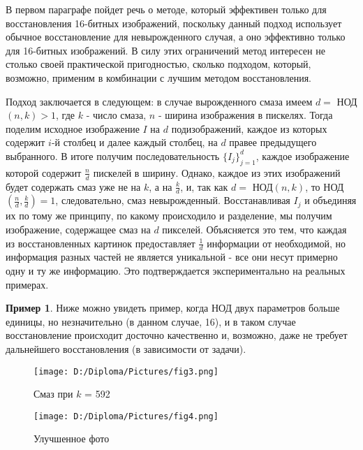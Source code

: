 \documentclass[a4paper]{article}
\theoremstyle{definition}
\newtheorem*{example}{Пример}
\begin{document}
    В первом параграфе пойдет речь о методе, который эффективен только для восстановления 16-битных изображений, поскольку данный подход использует обычное восстановление для невырожденного случая, а оно эффективно только для 16-битных изображений. В силу этих ограничений метод интересен не столько своей практической пригодностью, сколько подходом, который, возможно, применим в комбинации с лучшим методом восстановления.


    Подход заключается в следующем: в случае вырожденного смаза имеем $d =$ НОД$(n, k) > 1$, где $k$ - число смаза, $n$ - ширина изображения в пискелях. Тогда поделим исходное изображение $I$ на $d$ подизображений, каждое из которых содержит $i$-й столбец и далее каждый столбец, на $d$ правее предыдущего выбранного. В итоге получим последовательность $\{I_j\}_{j=1}^{d}$, каждое изображение которой содержит $\frac{n}{d}$ пискелей в ширину. Однако, каждое из этих изображений будет содержать смаз уже не на $k$, а на $\frac{k}{d}$, и, так как $d =$ НОД$(n, k)$, то НОД$(\frac{n}{d}, \frac{k}{d}) = 1$, следовательно, смаз невырожденный. Восстанавливая $I_j$ и объединяя их по тому же принципу, по какому происходило и разделение, мы получим изображение, содержащее смаз на $d$ пикселей. Объясняется это тем, что каждая из восстановленных картинок предоставляет $\frac{1}{d}$ информации от необходимой, но информация разных частей не является уникальной - все они несут примерно одну и ту же информацию. Это подтверждается экспериментально на реальных примерах.

\newpage

\begin{example}

Ниже можно увидеть пример, когда НОД двух параметров больше единицы, но незначительно (в данном случае, 16), и в таком случае восстановление происходит досточно качественно и, возможно, даже не требует дальнейшего восстановления (в зависимости от задачи).

\begin{minipage}{70mm}
    \begin{figure}[H]
            \texttt{[image: D:/Diploma/Pictures/fig3.png]}
            \label{Fig3}
            \caption[Смаз при $k$ = 592]{Смаз при $k$ = 592}
        \end{figure}
\end{minipage}
\hfill
\begin{minipage}{70mm}
  \begin{figure}[H]
            \texttt{[image: D:/Diploma/Pictures/fig4.png]}
            \label{Fig4}
            \caption[Улучшенное фото]{Улучшенное фото}
        \end{figure}
\end{minipage}
\hfill

\end{example}
\end{document}
